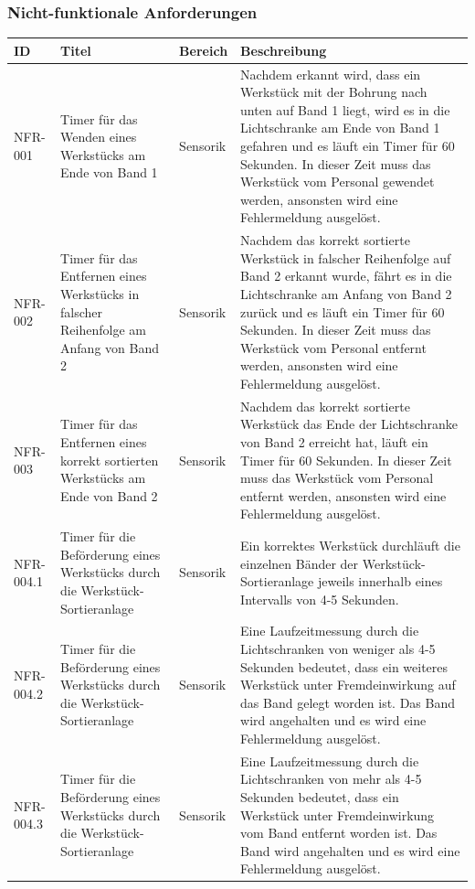 \documentclass[oneside,a4paper,titlepage]{scrartcl} %
\begin{document}
\subsubsection{Nicht-funktionale Anforderungen}
\begin{small}
 \begin{longtable}{|p{2cm}|p{4cm}|p{1.5cm}|p{5.5cm}|}
  \hline
  \textbf{ID} & \textbf{Titel} & \textbf{Bereich} & \textbf{Beschreibung}\\
  \toprule
  \endhead
  \hline
  NFR-001 & Timer für das Wenden eines Werkstücks am Ende von Band 1 & Sensorik & Nachdem erkannt wird, dass ein Werkstück mit der Bohrung nach unten auf Band 1 liegt, wird es in die Lichtschranke am Ende von Band 1 gefahren und es läuft ein Timer für 60 Sekunden. In dieser Zeit muss das Werkstück vom Personal gewendet werden, ansonsten wird eine Fehlermeldung ausgelöst.\\
  \hline
  \rowcolor{gray} NFR-002 & Timer für das Entfernen eines Werkstücks in falscher Reihenfolge am Anfang von Band 2 &  Sensorik & Nachdem das korrekt sortierte Werkstück in falscher Reihenfolge auf Band 2 erkannt wurde, fährt es in die Lichtschranke am Anfang von Band 2 zurück und es läuft ein Timer für 60 Sekunden. In dieser Zeit muss das Werkstück vom Personal entfernt werden, ansonsten wird eine Fehlermeldung ausgelöst.\\
  \hline
  NFR-003 & Timer für das Entfernen eines korrekt sortierten Werkstücks am Ende von Band 2 & Sensorik & Nachdem das korrekt sortierte Werkstück das Ende der Lichtschranke von Band 2 erreicht hat, läuft ein Timer für 60 Sekunden. In dieser Zeit muss das Werkstück vom Personal entfernt werden, ansonsten wird eine Fehlermeldung ausgelöst.\\
  \hline
  \rowcolor{gray} NFR-004.1 & Timer für die Beförderung eines Werkstücks durch die Werkstück-Sortieranlage & Sensorik & Ein korrektes Werkstück durchläuft die einzelnen Bänder der Werkstück-Sortieranlage jeweils innerhalb eines Intervalls von 4-5 Sekunden.\\
  \hline
  \rowcolor{gray} NFR-004.2 & Timer für die Beförderung eines Werkstücks durch die Werkstück-Sortieranlage & Sensorik & Eine Laufzeitmessung durch die Lichtschranken von weniger als 4-5 Sekunden bedeutet, dass ein weiteres Werkstück unter Fremdeinwirkung auf das Band gelegt worden ist. Das Band wird angehalten und es wird eine Fehlermeldung ausgelöst.\\
  \hline
  \rowcolor{gray} NFR-004.3 & Timer für die Beförderung eines Werkstücks durch die Werkstück-Sortieranlage & Sensorik & Eine Laufzeitmessung durch die Lichtschranken von mehr als 4-5 Sekunden bedeutet, dass ein Werkstück unter Fremdeinwirkung vom Band entfernt worden ist. Das Band wird angehalten und es wird eine Fehlermeldung ausgelöst.\\

\end{longtable}
\end{small}
\end{document}
